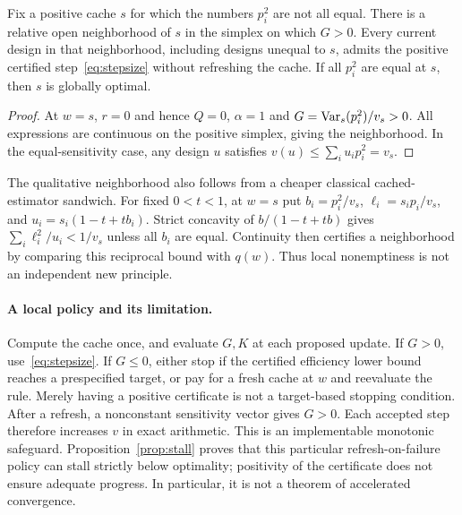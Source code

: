 \documentclass[11pt]{article}
\begin{document}
\begin{corollary}\label{cor:local}
Fix a positive cache $s$ for which the numbers $p_i^2$ are not all equal.
There is a relative open neighborhood of $s$ in the simplex on which $G>0$.
Every current design in that neighborhood, including designs unequal to $s$, admits the positive certified step~\eqref{eq:stepsize} without refreshing the cache.
If all $p_i^2$ are equal at $s$, then $s$ is globally optimal.
\end{corollary}
\begin{proof}
At $w=s$, $r=0$ and hence $Q=0$, $\alpha=1$ and
$G=\operatorname{Var}_s(p_i^2)/v_s>0$.
All expressions are continuous on the positive simplex, giving the neighborhood.
In the equal-sensitivity case, any design $u$ satisfies
$v(u)\le\sum_i u_i p_i^2=v_s$.
\end{proof}

The qualitative neighborhood also follows from a cheaper classical cached-estimator sandwich. For fixed $0<t<1$, at $w=s$ put $b_i=p_i^2/v_s$, $\ell_i=s_ip_i/v_s$, and $u_i=s_i(1-t+tb_i)$. Strict concavity of $b/(1-t+tb)$ gives $\sum_i\ell_i^2/u_i<1/v_s$ unless all $b_i$ are equal. Continuity then certifies a neighborhood by comparing this reciprocal bound with $q(w)$. Thus local nonemptiness is not an independent new principle.

\paragraph{A local policy and its limitation.}
Compute the cache once, and evaluate $G,K$ at each proposed update.
If $G>0$, use~\eqref{eq:stepsize}.
If $G\le0$, either stop if the certified efficiency lower bound reaches a prespecified target, or pay for a fresh cache at $w$ and reevaluate the rule. Merely having a positive certificate is not a target-based stopping condition.
After a refresh, a nonconstant sensitivity vector gives $G>0$.
Each accepted step therefore increases $v$ in exact arithmetic.
This is an implementable monotonic safeguard. Proposition~\ref{prop:stall} proves that this particular refresh-on-failure policy can stall strictly below optimality; positivity of the certificate does not ensure adequate progress.
In particular, it is not a theorem of accelerated convergence.
\end{document}
